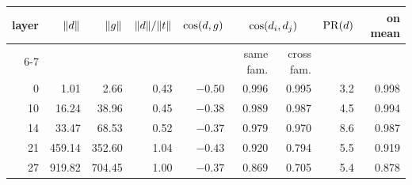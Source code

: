 \begin{tabular}{rrrrrrrrr}
\toprule
layer & $\|d\|$ & $\|g\|$ & $\|d\|/\|t\|$ & $\cos(d,g)$
& \multicolumn{2}{c}{$\cos(d_i,d_j)$} & $\mathrm{PR}(d)$ & on mean \\
\cmidrule(lr){6-7}
& & & & & same fam. & cross fam. & & \\
\midrule
 0 &     1.01 &     2.66 & 0.43 & $-0.50$ & 0.996 & 0.995 & 3.2 & 0.998 \\
10 &    16.24 &    38.96 & 0.45 & $-0.38$ & 0.989 & 0.987 & 4.5 & 0.994 \\
14 &    33.47 &    68.53 & 0.52 & $-0.37$ & 0.979 & 0.970 & 8.6 & 0.987 \\
21 &   459.14 &   352.60 & 1.04 & $-0.43$ & 0.920 & 0.794 & 5.5 & 0.919 \\
27 &   919.82 &   704.45 & 1.00 & $-0.37$ & 0.869 & 0.705 & 5.4 & 0.878 \\
\bottomrule
\end{tabular}
